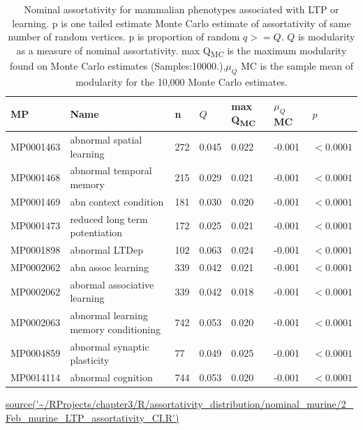 \begin{table}[ht]
\centering
\begin{adjustbox}{width=\textwidth}


\begin{tabular}{lllllll}
  \toprule
MP & Name & n & $Q$ & max Q\textsubscript{MC} & $\mu_Q$ MC & $p$ \\ 
  \midrule
MP0001463 & abnormal spatial learning & 272 & 0.045 & 0.022 & -0.001 & $<0.0001$ \\ 
  MP0001468 & abnormal temporal memory & 215 & 0.029 & 0.021 & -0.001 & $<0.0001$ \\ 
  MP0001469 & abn context condition & 181 & 0.030 & 0.020 & -0.001 & $<0.0001$ \\ 
  MP0001473 & reduced long term potentiation & 172 & 0.025 & 0.021 & -0.001 & $<0.0001$ \\ 
  MP0001898 & abnormal LTDep & 102 & 0.063 & 0.024 & -0.001 & $<0.0001$ \\ 
  MP0002062 & abn assoc learning & 339 & 0.042 & 0.021 & -0.001 & $<0.0001$ \\ 
  MP0002062 & abormal associative learning & 339 & 0.042 & 0.018 & -0.001 & $<0.0001$ \\ 
  MP0002063 & abnormal learning memory conditioning & 742 & 0.053 & 0.020 & -0.001 & $<0.0001$ \\ 
  MP0004859 & abnormal synaptic plasticity & 77 & 0.049 & 0.025 & -0.001 & $<0.0001$ \\ 
  MP0014114 & abnormal cognition & 744 & 0.053 & 0.020 & -0.001 & $<0.0001$ \\ 
   \bottomrule
\end{tabular}
\end{adjustbox}
\caption[Nominal assortativity of gene sets of mammalian phenotypes associated with LTP or learning]{Nominal assortativity for mammalian phenotypes associated with LTP or learning. p is one tailed estimate Monte Carlo estimate of assortativity of same number of random vertices. p is proportion of random $q>=Q$. $Q$ is modularity as a measure of nominal assortativity. max Q\textsubscript{MC} is the maximum modularity found on Monte Carlo estimates (Samples:10000.),$\mu_Q$ MC is the sample mean of modularity for the 10,000 Monte Carlo estimates. }
\tiny\url{source('~/RProjects/chapter3/R/assortativity_distribution/nominal_murine/2_Feb_murine_LTP_assortativity_CI.R')} 
\label{tab:Nominal assortativity for mammalian phenotypes. p is one tailed estimate Monte Carlo estimate of assortativity of same number of random vertices. p is proportion of random $q>=Q$. Samples:10000}
\end{table}

